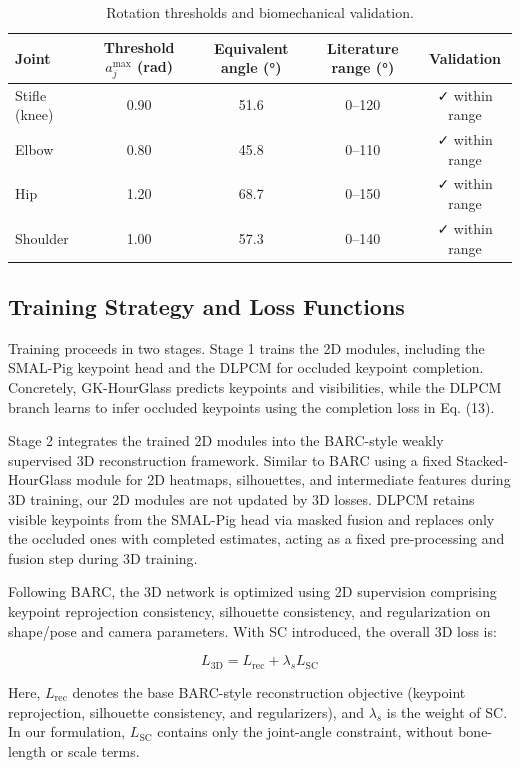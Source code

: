 \documentclass[computers,article,submit,pdftex,moreauthors]{mdpi}
\begin{document}
\begin{table}[H]
\caption{Rotation thresholds and biomechanical validation.}
\label{tab:biomech_thresholds}
\centering
\begin{tabular}{lcccc}
\toprule
\textbf{Joint} & \textbf{Threshold $a_j^{\max}$ (rad)} & \textbf{Equivalent angle (°)} & \textbf{Literature range (°)} & \textbf{Validation} \\
\midrule
Stifle (knee) & 0.90 & 51.6 & 0--120 & ✓ within range \\
Elbow & 0.80 & 45.8 & 0--110 & ✓ within range \\
Hip & 1.20 & 68.7 & 0--150 & ✓ within range \\
Shoulder & 1.00 & 57.3 & 0--140 & ✓ within range \\
\bottomrule
\end{tabular}
\end{table}

\subsection{Training Strategy and Loss Functions}\label{sec:training}

Training proceeds in two stages. Stage 1 trains the 2D modules, including the SMAL-Pig keypoint head and the DLPCM for occluded keypoint completion. Concretely, GK-HourGlass predicts keypoints and visibilities, while the DLPCM branch learns to infer occluded keypoints using the completion loss in Eq. (13).

Stage 2 integrates the trained 2D modules into the BARC-style weakly supervised 3D reconstruction framework. Similar to BARC using a fixed Stacked-HourGlass module for 2D heatmaps, silhouettes, and intermediate features during 3D training, our 2D modules are not updated by 3D losses. DLPCM retains visible keypoints from the SMAL-Pig head via masked fusion and replaces only the occluded ones with completed estimates, acting as a fixed pre-processing and fusion step during 3D training.

Following BARC, the 3D network is optimized using 2D supervision comprising keypoint reprojection consistency, silhouette consistency, and regularization on shape/pose and camera parameters. With SC introduced, the overall 3D loss is:

\begin{equation}
L_{\text{3D}} = L_{\text{rec}} + \lambda_s L_{\text{SC}}
\end{equation}

Here, $L_{\text{rec}}$ denotes the base BARC-style reconstruction objective (keypoint reprojection, silhouette consistency, and regularizers), and $\lambda_s$ is the weight of SC. In our formulation, $L_{\text{SC}}$ contains only the joint-angle constraint, without bone-length or scale terms.
\end{document}
